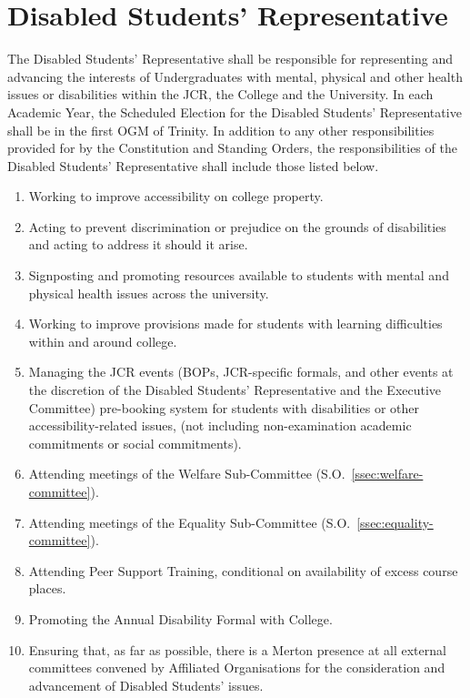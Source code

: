 \section{Disabled Students' Representative}
\npara The Disabled Students' Representative shall be responsible for representing and advancing the interests of Undergraduates with mental, physical and other health issues or disabilities within the JCR, the College and the University. 
\npara In each Academic Year, the Scheduled Election for the Disabled Students' Representative shall be in the first OGM of Trinity.
\npara In addition to any other responsibilities provided for by the Constitution and Standing Orders, the responsibilities of the Disabled Students' Representative shall include those listed below.
\begin{enumerate}
	\item Working to improve accessibility on college property.
	\item Acting to prevent discrimination or prejudice on the grounds of disabilities and acting to address it should it arise.
	\item Signposting and promoting resources available to students with mental and physical health issues across the university.
	\item Working to improve provisions made for students with learning difficulties within and around college.
	\item Managing the JCR events (BOPs, JCR-specific formals, and other events at the discretion of the Disabled Students' Representative and the Executive Committee) pre-booking system for students with disabilities or other accessibility-related issues, (not including non-examination academic commitments or social commitments).
	\item Attending meetings of the Welfare Sub-Committee (S.O.~\ref{ssec:welfare-committee}).
	\item Attending meetings of the Equality Sub-Committee (S.O.~\ref{ssec:equality-committee}).
	\item Attending Peer Support Training, conditional on availability of excess course places.
	\item Promoting the Annual Disability Formal with College.
	\item Ensuring that, as far as possible, there is a Merton presence at all external committees convened by Affiliated Organisations for the consideration and advancement of Disabled Students' issues.
\end{enumerate}

